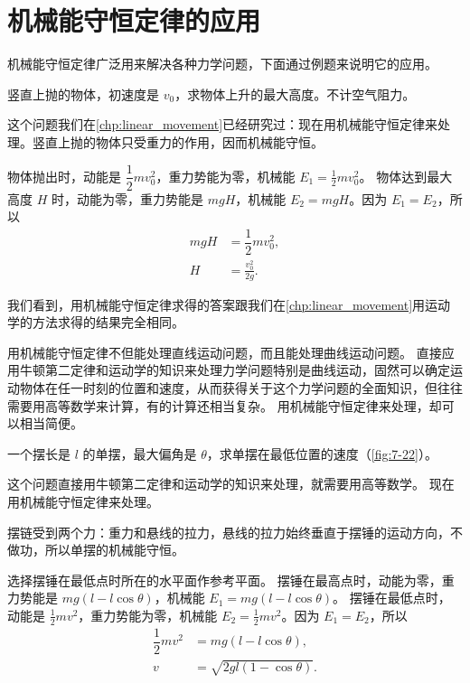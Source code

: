 \section{机械能守恒定律的应用}
机械能守恒定律广泛用来解决各种力学问题，下面通过例题来说明它的应用。

\begin{example}
  竖直上抛的物体，初速度是 $v_0$，求物体上升的最大高度。不计空气阻力。
\end{example}

\begin{solution}
这个问题我们在\cref{chp:linear_movement}已经研究过：现在用机械能守恒定律来处理。竖直上抛的物体只受重力的作用，因而机械能守恒。

物体抛出时，动能是 $\dfrac{1}{2}mv^2_0$，重力势能为零，机械能 $E_1=\frac{1}{2}mv^2_0$。
物体达到最大高度 $H$ 时，动能为零，重力势能是 $mgH$，机械能 $E_2=mgH$。因为 $E_1=E_2$，所以
\[\begin{split}
    mgH&=\dfrac{1}{2}mv^2_0,\\
    H&=\frac{v^2_0}{2g}.
\end{split}\]
\end{solution}

我们看到，用机械能守恒定律求得的答案跟我们在\cref{chp:linear_movement}用运动学的方法求得的结果完全相同。

用机械能守恒定律不但能处理直线运动问题，而且能处理曲线运动问题。
直接应用牛顿第二定律和运动学的知识来处理力学问题特别是曲线运动，固然可以确定运动物体在任一时刻的位置和速度，从而获得关于这个力学问题的全面知识，但往往需要用高等数学来计算，有的计算还相当复杂。
用机械能守恒定律来处理，却可以相当简便。

\begin{example}
  一个摆长是 $l$ 的单摆，最大偏角是 $\theta$，求单摆在最低位置的速度（\cref{fig:7-22}）。
\end{example}

\begin{solution}
这个问题直接用牛顿第二定律和运动学的知识来处理，就需要用高等数学。
现在用机械能守恒定律来处理。

摆链受到两个力：重力和悬线的拉力，悬线的拉力始终垂直于摆锤的运动方向，不做功，所以单摆的机械能守恒。

选择摆锤在最低点时所在的水平面作参考平面。
摆锤在最高点时，动能为零，重力势能是 $mg(l-l\cos\theta)$，机械能 $E_1=mg(l-l\cos\theta)$。 
摆锤在最低点时，动能是 $\frac{1}{2}mv^2$，重力势能为零，机械能 $E_2=\frac{1}{2}mv^2$。因为 $E_1=E_2$，所以
\[\begin{split}
    \dfrac{1}{2}mv^2&=mg(l-l\cos\theta),\\
    v&=\sqrt{2gl(1-\cos\theta)}.
\end{split}\]
\end{solution}

